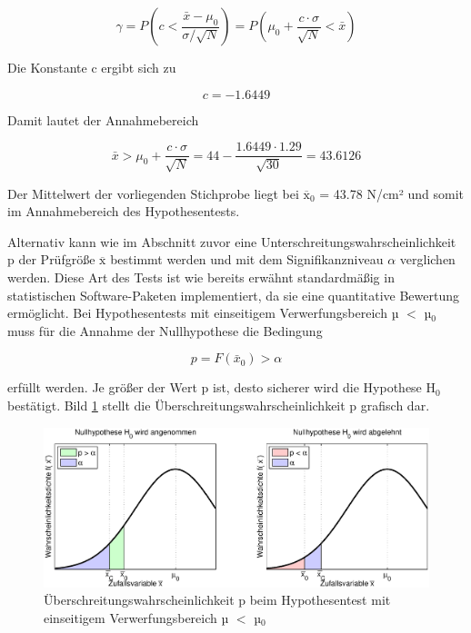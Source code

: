 \begin{equation}\label{eq:sixtwentyseven}
\gamma =P\left(c<\dfrac{\bar{x}-\mu _{0} }{\sigma /\sqrt{N}} \right)=P\left(\mu _{0} +\dfrac{c\cdot \sigma }{\sqrt{N}} <\bar{x}\right)
\end{equation}

\noindent Die Konstante c ergibt sich zu

\begin{equation}\label{eq:sixtwentyeight}
c=-1.6449
\end{equation}

\noindent Damit lautet der Annahmebereich 

\begin{equation}\label{eq:sixtwentynine}
\bar{x}>\mu _{0} +\dfrac{c\cdot \sigma}{\sqrt{N}} =44-\dfrac{1.6449\cdot 1.29}{\sqrt{30}} =43.6126
\end{equation}

\noindent Der Mittelwert der vorliegenden Stichprobe liegt bei ${\overline{\mathrm{x}}}_0$ = 43.78 N/cm² und somit im Annahmebereich des Hypothesentests.

\noindent Alternativ kann wie im Abschnitt zuvor eine Unterschreitungswahrscheinlichkeit p der Pr\"{u}fgr\"{o}{\ss}e $\overline{\mathrm{x}}$ bestimmt werden und mit dem Signifikanzniveau $\alpha$ verglichen werden. Diese Art des Tests ist wie bereits erw\"{a}hnt standardm\"{a}{\ss}ig in statistischen Software-Paketen implementiert, da sie eine quantitative Bewertung erm\"{o}glicht. Bei Hypothesentests mit einseitigem Verwerfungsbereich µ $\mathrm{<}$ µ$_{0}$ muss f\"{u}r die Annahme der Nullhypothese die Bedingung

\begin{equation}\label{eq:sixthirty}
p=F(\bar{x}_{0})>\alpha
\end{equation}

\noindent erf\"{u}llt werden. Je gr\"{o}{\ss}er der Wert p ist, desto sicherer wird die Hypothese H$_{0}$ best\"{a}tigt. Bild \ref{fig:HypothesentestLinkerVerwerfungsbereichPvalue} stellt die \"{U}berschreitungswahrscheinlichkeit p grafisch dar. 

\noindent 
\begin{figure}[H]
  \centerline{\includegraphics[width=1\textwidth]{Kapitel6/Bilder/image6}}
  \caption{\"{U}berschreitungswahrscheinlichkeit p beim Hypothesentest mit einseitigem Verwerfungsbereich µ $\mathrm{<}$ µ$_{0}$}
  \label{fig:HypothesentestLinkerVerwerfungsbereichPvalue}
\end{figure}

